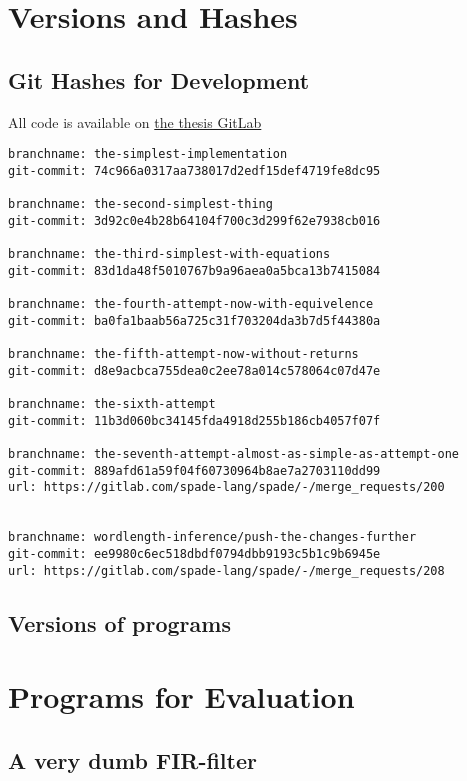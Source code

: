 \chapter{Versions and Hashes}
\label{app:VersionsAndGitHashes}
\section{Git Hashes for Development}
All code is available on \href{https://gitlab.com/FredTheDino/spade}{the thesis GitLab}
\begin{verbatim}
branchname: the-simplest-implementation
git-commit: 74c966a0317aa738017d2edf15def4719fe8dc95

branchname: the-second-simplest-thing
git-commit: 3d92c0e4b28b64104f700c3d299f62e7938cb016

branchname: the-third-simplest-with-equations
git-commit: 83d1da48f5010767b9a96aea0a5bca13b7415084

branchname: the-fourth-attempt-now-with-equivelence
git-commit: ba0fa1baab56a725c31f703204da3b7d5f44380a

branchname: the-fifth-attempt-now-without-returns
git-commit: d8e9acbca755dea0c2ee78a014c578064c07d47e

branchname: the-sixth-attempt
git-commit: 11b3d060bc34145fda4918d255b186cb4057f07f

branchname: the-seventh-attempt-almost-as-simple-as-attempt-one
git-commit: 889afd61a59f04f60730964b8ae7a2703110dd99
url: https://gitlab.com/spade-lang/spade/-/merge_requests/200


branchname: wordlength-inference/push-the-changes-further
git-commit: ee9980c6ec518dbdf0794dbb9193c5b1c9b6945e
url: https://gitlab.com/spade-lang/spade/-/merge_requests/208
\end{verbatim}

\section{Versions of programs}

\chapter{Programs for Evaluation}
\label{app:Programs}

\section{A very dumb FIR-filter}


